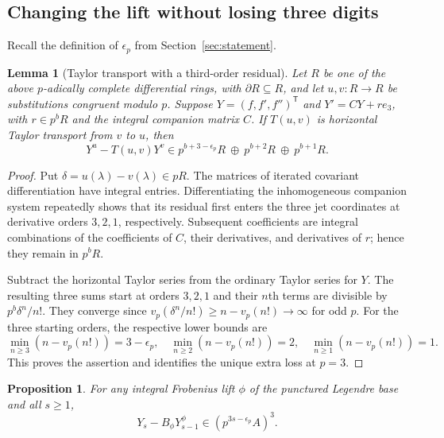 \documentclass[11pt,a4paper]{article}
\newtheorem{lemma}[theorem]{Lemma}
\newtheorem{proposition}[theorem]{Proposition}
\begin{document}
\subsection{Changing the lift without losing three digits}

Recall the definition of $\epsilon_p$ from Section~\ref{sec:statement}.

\begin{lemma}[Taylor transport with a third-order residual]
\label{ss:taylor}
Let $R$ be one of the above $p$-adically complete differential rings, with
$\partial R\subseteq R$, and let $u,v:R\to R$ be substitutions congruent
modulo $p$.  Suppose $Y=(f,f',f'')^{\mathsf T}$ and
$Y'=CY+re_3$, with $r\in p^bR$ and the integral companion matrix $C$.
If $T(u,v)$ is horizontal Taylor transport from $v$ to $u$, then
\[
 Y^u-T(u,v)Y^v\in
 p^{b+3-\epsilon_p}R\ \oplus\
 p^{b+2}R\ \oplus\ p^{b+1}R.
\]
\end{lemma}

\begin{proof}
Put $\delta=u(\lambda)-v(\lambda)\in pR$.
The matrices of iterated covariant differentiation have integral
entries.  Differentiating the inhomogeneous companion system repeatedly
shows that its residual first enters the three jet coordinates at
derivative orders $3,2,1$, respectively.  Subsequent coefficients are
integral combinations of the coefficients of $C$, their derivatives,
and derivatives of $r$; hence they remain in $p^bR$.

Subtract the horizontal Taylor series from the ordinary Taylor series
for $Y$.  The resulting three sums start at orders $3,2,1$ and their
$n$th terms are divisible by $p^b\delta^n/n!$.  They converge since
$v_p(\delta^n/n!)\geq n-v_p(n!)\to\infty$ for odd $p$.
For the three starting orders, the respective lower bounds are
\[
 \min_{n\geq3}(n-v_p(n!))=3-\epsilon_p,\quad
 \min_{n\geq2}(n-v_p(n!))=2,\quad
 \min_{n\geq1}(n-v_p(n!))=1.
\]
This proves the assertion and identifies the unique extra loss at $p=3$.
\end{proof}

\begin{proposition}\label{ss:regularjet}
For any integral Frobenius lift $\phi$ of the punctured Legendre base and
all $s\geq1$,
\[
 Y_s-B_\phi Y_{s-1}^\phi\in(p^{3s-\epsilon_p}A)^3.
\]
\end{proposition}
\end{document}
